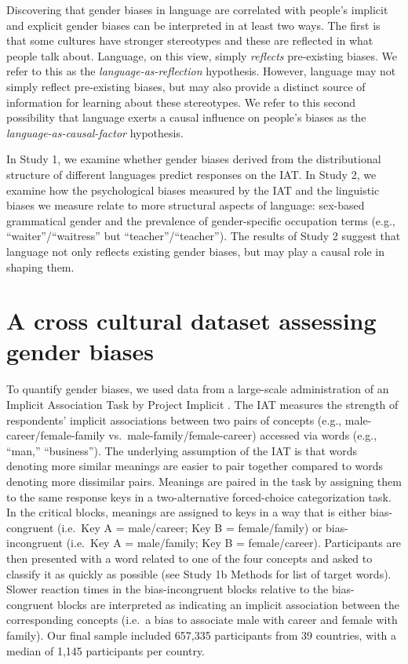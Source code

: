 \documentclass[9pt,twocolumn,twoside]{pnas-new}
\begin{document}
Discovering that gender biases in language are correlated with people’s implicit and explicit gender biases can be interpreted in at least two ways.  The first is that some cultures have stronger stereotypes and these are reflected in what people talk
about. Language, on this view, simply \emph{reflects} pre-existing
biases. We refer to this as the \emph{language-as-reflection}
hypothesis. However, language may not simply reflect pre-existing
biases, but may also provide a distinct source of information for
learning about these stereotypes. We refer to this second possibility
that language exerts a causal influence on people's biases as the
\emph{language-as-causal-factor} hypothesis.

In Study 1, we examine whether gender biases derived from the distributional structure of different languages predict responses on the IAT. In Study 2, we examine how the psychological
biases measured by the IAT and the linguistic biases we measure relate
to more structural aspects of language: sex-based grammatical gender and
the prevalence of gender-specific occupation terms (e.g.,
\enquote{waiter}/\enquote{waitress} but
\enquote{teacher}/\enquote{teacher}). The results of Study 2 suggest
that language not only reflects existing gender biases, but may play a
causal role in shaping them.

\section*{A cross cultural dataset assessing gender biases}\label{description-of-cross-cultural-dataset-of-psychological-gender-bias}

To quantify gender biases, we used data from a large-scale administration of an Implicit Association Task \citep[IAT,][]{greenwald1998measuring} by Project Implicit \cite[\url{https://implicit.harvard.edu/implicit/}]{nosek2002harvesting}. The IAT measures the strength of respondents' implicit associations between two pairs of concepts (e.g., male-career/female-family vs.~male-family/female-career) accessed via
words (e.g., \enquote{man,} \enquote{business}). The underlying
assumption of the IAT is that words denoting more similar meanings
are easier to pair together compared to words denoting more dissimilar pairs. Meanings are paired in the task by assigning them to the same response
keys in a two-alternative forced-choice categorization task. In the
critical blocks, meanings are assigned to keys in a way that
is either bias-congruent (i.e.~Key A = male/career; Key B =
female/family) or bias-incongruent (i.e.~Key A = male/family; Key B =
female/career). Participants are then presented with a word related to
one of the four concepts and asked to classify it as quickly as possible
(see Study 1b Methods for list of target words). Slower reaction times
in the bias-incongruent blocks relative to the bias-congruent blocks are
interpreted as indicating an implicit association between the
corresponding concepts (i.e.~a bias to associate male with career and
female with family). Our final sample included 657,335 participants from 39 countries, with a
median of 1,145 participants per country.
\end{document}
